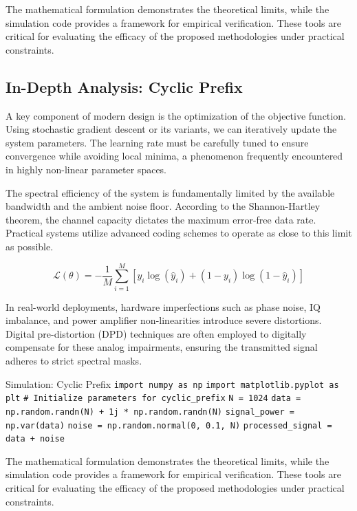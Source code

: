 \vspace{0.5cm}
The mathematical formulation demonstrates the theoretical limits, while the simulation code provides a framework for empirical verification. These tools are critical for evaluating the efficacy of the proposed methodologies under practical constraints.


\subsection{In-Depth Analysis: Cyclic Prefix}
A key component of modern design is the optimization of the objective function. Using stochastic gradient descent or its variants, we can iteratively update the system parameters. The learning rate must be carefully tuned to ensure convergence while avoiding local minima, a phenomenon frequently encountered in highly non-linear parameter spaces.

The spectral efficiency of the system is fundamentally limited by the available bandwidth and the ambient noise floor. According to the Shannon-Hartley theorem, the channel capacity dictates the maximum error-free data rate. Practical systems utilize advanced coding schemes to operate as close to this limit as possible.

\begin{equation}
    \mathcal{L}(\theta) = -\frac{1}{M} \sum_{i=1}^{M} \left[ y_i \log(\hat{y}_i) + (1-y_i)\log(1-\hat{y}_i) \right]
\end{equation}

In real-world deployments, hardware imperfections such as phase noise, IQ imbalance, and power amplifier non-linearities introduce severe distortions. Digital pre-distortion (DPD) techniques are often employed to digitally compensate for these analog impairments, ensuring the transmitted signal adheres to strict spectral masks.

\begin{pythonbox}{Simulation: Cyclic Prefix}
\texttt{import numpy as np}
\texttt{import matplotlib.pyplot as plt}
\texttt{}
\texttt{\# Initialize parameters for cyclic\_prefix}
\texttt{N = 1024}
\texttt{data = np.random.randn(N) + 1j * np.random.randn(N)}
\texttt{signal\_power = np.var(data)}
\texttt{noise = np.random.normal(0, 0.1, N)}
\texttt{processed\_signal = data + noise}
\end{pythonbox}

\vspace{0.5cm}
The mathematical formulation demonstrates the theoretical limits, while the simulation code provides a framework for empirical verification. These tools are critical for evaluating the efficacy of the proposed methodologies under practical constraints.


